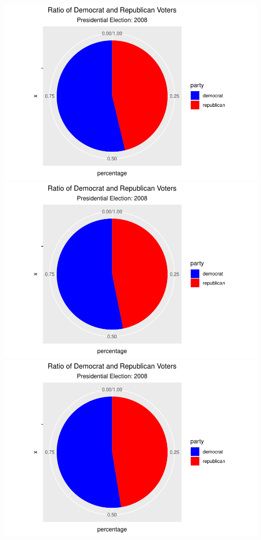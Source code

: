 \documentclass[
]{article}
\begin{document}
\includegraphics{election_files/figure-latex/anim-79.pdf}
\includegraphics{election_files/figure-latex/anim-80.pdf}
\includegraphics{election_files/figure-latex/anim-81.pdf}
\end{document}
